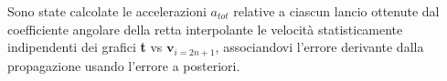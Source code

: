 \documentclass[a4paper,11pt,oneside]{article}
\begin{document}

Sono state calcolate le accelerazioni $a_{tot}$ relative a ciascun lancio ottenute dal coefficiente angolare della retta interpolante le velocità statisticamente indipendenti dei grafici \textbf{t} vs $\textbf{v}_{i=2n+1}$, associandovi l'errore derivante dalla propagazione usando l'errore a posteriori.
\end{document}

